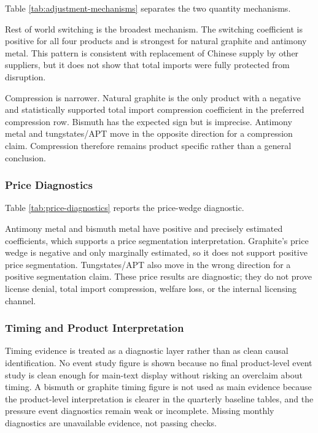 \documentclass[12pt,a4paper]{article}
\numberwithin{equation}{section}
\begin{document}
Table \ref{tab:adjustment-mechanisms} separates the two quantity mechanisms.



Rest of world switching is the broadest mechanism. The switching coefficient is positive for all four products and is strongest for natural graphite and antimony metal. This pattern is consistent with replacement of Chinese supply by other suppliers, but it does not show that total imports were fully protected from disruption.

Compression is narrower. Natural graphite is the only product with a negative and statistically supported total import compression coefficient in the preferred compression row. Bismuth has the expected sign but is imprecise. Antimony metal and tungstates/APT move in the opposite direction for a compression claim. Compression therefore remains product specific rather than a general conclusion.

\subsubsection{Price Diagnostics}

Table \ref{tab:price-diagnostics} reports the price-wedge diagnostic.



Antimony metal and bismuth metal have positive and precisely estimated coefficients, which supports a price segmentation interpretation. Graphite's price wedge is negative and only marginally estimated, so it does not support positive price segmentation. Tungstates/APT also move in the wrong direction for a positive segmentation claim. These price results are diagnostic; they do not prove license denial, total import compression, welfare loss, or the internal licensing channel.

\subsubsection{Timing and Product Interpretation}

Timing evidence is treated as a diagnostic layer rather than as clean causal identification. No event study figure is shown because no final product-level event study is clean enough for main-text display without risking an overclaim about timing. A bismuth or graphite timing figure is not used as main evidence because the product-level interpretation is clearer in the quarterly baseline tables, and the pressure event diagnostics remain weak or incomplete. Missing monthly diagnostics are unavailable evidence, not passing checks.
\end{document}

